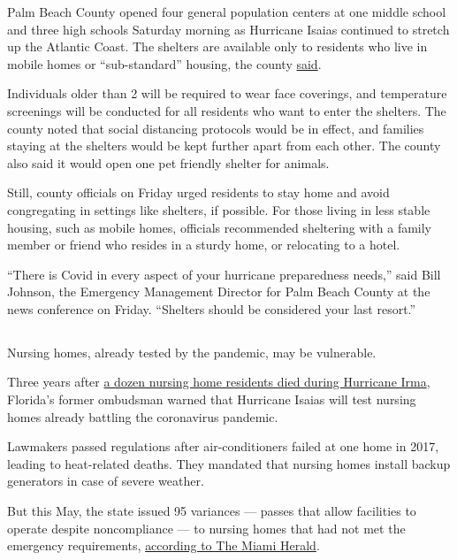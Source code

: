 Palm Beach County opened four general population centers at one middle
school and three high schools Saturday morning as Hurricane Isaias
continued to stretch up the Atlantic Coast. The shelters are available
only to residents who live in mobile homes or ``sub-standard'' housing,
the county
\href{https://discover.pbcgov.org/Lists/Newsroom/NewsDispForm.aspx?ID=3014}{said}.

Individuals older than 2 will be required to wear face coverings, and
temperature screenings will be conducted for all residents who want to
enter the shelters. The county noted that social distancing protocols
would be in effect, and families staying at the shelters would be kept
further apart from each other. The county also said it would open one
pet friendly shelter for animals.

Still, county officials on Friday urged residents to stay home and avoid
congregating in settings like shelters, if possible. For those living in
less stable housing, such as mobile homes, officials recommended
sheltering with a family member or friend who resides in a sturdy home,
or relocating to a hotel.

``There is Covid in every aspect of your hurricane preparedness needs,''
said Bill Johnson, the Emergency Management Director for Palm Beach
County at the news conference on Friday. ``Shelters should be considered
your last resort.''

\hypertarget{-2}{%
\subsection{}\label{-2}}

Nursing homes, already tested by the pandemic, may be vulnerable.

Three years after
\href{https://www.nytimes3xbfgragh.onion/2019/08/24/us/4-charged-holywood-hills-deaths-hurricane-irma-florida.html}{a
dozen nursing home residents died during Hurricane Irma}, Florida's
former ombudsman warned that Hurricane Isaias will test nursing homes
already battling the coronavirus pandemic.

Lawmakers passed regulations after air-conditioners failed at one home
in 2017, leading to heat-related deaths. They mandated that nursing
homes install backup generators in case of severe weather.

But this May, the state issued 95 variances --- passes that allow
facilities to operate despite noncompliance --- to nursing homes that
had not met the emergency requirements,
\href{https://www.miamiherald.com/article242595251.html}{according to
The Miami Herald}.

